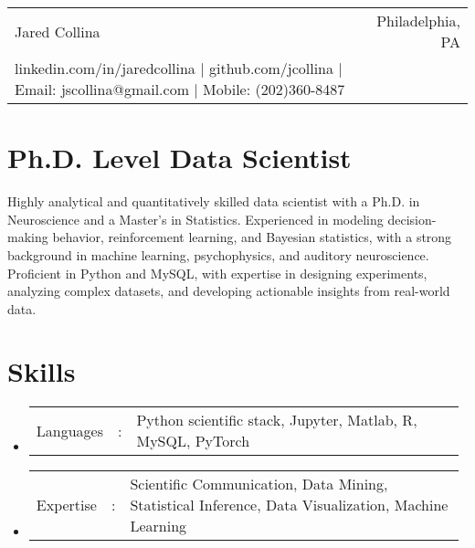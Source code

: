 \documentclass[a4paper,11pt]{article}
\newcommand{\resumeSectionType}[3]{
  \item\begin{tabular*}{0.96\textwidth}[t]{
    p{0.15\linewidth}p{0.02\linewidth}p{0.81\linewidth}
  }
   #1 & #2 & #3
  \end{tabular*}\vspace{-2pt}
}
\newcommand{\resumeHeadingListStart}{
  \begin{itemize}[leftmargin=0.15in, label={}]
}
\newcommand{\resumeHeadingListEnd}{\end{itemize}}
\begin{document}

\begin{tabular*}{\textwidth}{l@{\extracolsep{\fill}}r}
  \Huge Jared Collina \vspace{2pt} & %
  Philadelphia, PA \\ %
  linkedin.com/in/jaredcollina $|$ %
  github.com/jcollina $|$ %
  Email: jscollina@gmail.com $|$ %
  Mobile: (202)360-8487 \\ %
\end{tabular*}



\section{Ph.D. Level Data Scientist}
\small{Highly analytical and quantitatively skilled data scientist with a Ph.D. in Neuroscience and a Master's in Statistics. Experienced in modeling decision-making behavior, reinforcement learning, and Bayesian statistics, with a strong background in machine learning, psychophysics, and auditory neuroscience. Proficient in Python and MySQL, with expertise in designing experiments, analyzing complex datasets, and developing actionable insights from real-world data.}



\section{Skills}
  \resumeHeadingListStart{}
    \resumeSectionType{Languages}{:}{Python scientific stack, Jupyter, Matlab, R, MySQL, PyTorch}
    \resumeSectionType{Expertise}{:}{Scientific Communication, Data Mining, Statistical Inference, Data Visualization, Machine Learning}
  \resumeHeadingListEnd{}
\end{document}
